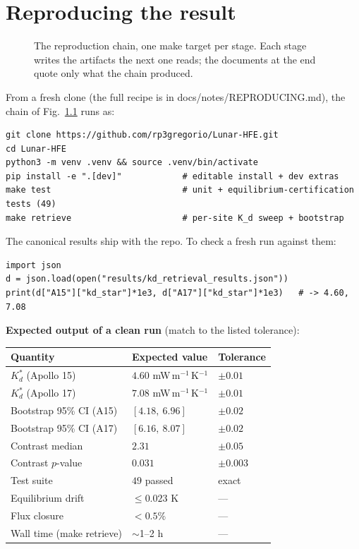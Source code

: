 \documentclass[11pt]{report}
\newcommand{\code}[1]{{\ttfamily\small #1}}
\begin{document}
\chapter{Reproducing the result}\label{app:repro}

\begin{figure}[htbp]\centering

\caption{The reproduction chain, one \code{make} target per stage. Each stage
writes the artifacts the next one reads; the documents at the end quote only
what the chain produced.}
\label{fig:makeflow}
\end{figure}

\noindent From a fresh clone (the full recipe is in \code{docs/notes/REPRODUCING.md}),
the chain of Fig.~\ref{fig:makeflow} runs as:
\begin{lstlisting}[style=py]
git clone https://github.com/rp3gregorio/Lunar-HFE.git
cd Lunar-HFE
python3 -m venv .venv && source .venv/bin/activate
pip install -e ".[dev]"            # editable install + dev extras
make test                          # unit + equilibrium-certification tests (49)
make retrieve                      # per-site K_d sweep + bootstrap
\end{lstlisting}

\noindent The canonical results ship with the repo. To check a fresh run against
them:
\begin{lstlisting}[style=py]
import json
d = json.load(open("results/kd_retrieval_results.json"))
print(d["A15"]["kd_star"]*1e3, d["A17"]["kd_star"]*1e3)   # -> 4.60, 7.08
\end{lstlisting}

\noindent\textbf{Expected output of a clean run} (match to the listed tolerance):
\begin{center}\small
\begin{tabular}{@{}lll@{}}
\toprule
Quantity & Expected value & Tolerance \\
\midrule
$K_d^{*}$ (Apollo 15) & $4.60$ mW\,m$^{-1}$\,K$^{-1}$ & $\pm 0.01$ \\
$K_d^{*}$ (Apollo 17) & $7.08$ mW\,m$^{-1}$\,K$^{-1}$ & $\pm 0.01$ \\
Bootstrap 95\% CI (A15) & $[4.18,\ 6.96]$ & $\pm 0.02$ \\
Bootstrap 95\% CI (A17) & $[6.16,\ 8.07]$ & $\pm 0.02$ \\
Contrast median & $2.31$ & $\pm 0.05$ \\
Contrast $p$-value & $0.031$ & $\pm 0.003$ \\
Test suite & $49$ passed & exact \\
Equilibrium drift & $\le 0.023$ K & --- \\
Flux closure & $< 0.5\%$ & --- \\
Wall time (\code{make retrieve}) & $\sim$1--2 h & --- \\
\bottomrule
\end{tabular}
\end{center}
\end{document}
